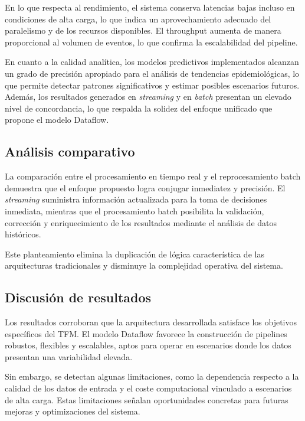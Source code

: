 \documentclass[12pt,a4paper]{article}
\begin{document}
En lo que respecta al rendimiento, el sistema conserva latencias bajas incluso en condiciones de alta carga, lo que indica un aprovechamiento adecuado del paralelismo y de los recursos disponibles. El throughput aumenta de manera proporcional al volumen de eventos, lo que confirma la escalabilidad del pipeline.

En cuanto a la calidad analítica, los modelos predictivos implementados alcanzan un grado de precisión apropiado para el análisis de tendencias epidemiológicas, lo que permite detectar patrones significativos y estimar posibles escenarios futuros. Además, los resultados generados en \emph{streaming} y en \emph{batch} presentan un elevado nivel de concordancia, lo que respalda la solidez del enfoque unificado que propone el modelo Dataflow.

\subsection{Análisis comparativo}\label{anuxe1lisis-comparativo}

La comparación entre el procesamiento en tiempo real y el reprocesamiento batch demuestra que el enfoque propuesto logra conjugar inmediatez y precisión. El \emph{streaming} suministra información actualizada para la toma de decisiones inmediata, mientras que el procesamiento batch posibilita la validación, corrección y enriquecimiento de los resultados mediante el análisis de datos históricos.

Este planteamiento elimina la duplicación de lógica característica de las arquitecturas tradicionales y disminuye la complejidad operativa del sistema.

\subsection{Discusión de resultados}\label{discusiuxf3n-de-resultados}

Los resultados corroboran que la arquitectura desarrollada satisface los objetivos específicos del TFM. El modelo Dataflow favorece la construcción de pipelines robustos, flexibles y escalables, aptos para operar en escenarios donde los datos presentan una variabilidad elevada.

Sin embargo, se detectan algunas limitaciones, como la dependencia respecto a la calidad de los datos de entrada y el coste computacional vinculado a escenarios de alta carga. Estas limitaciones señalan oportunidades concretas para futuras mejoras y optimizaciones del sistema.
\end{document}
